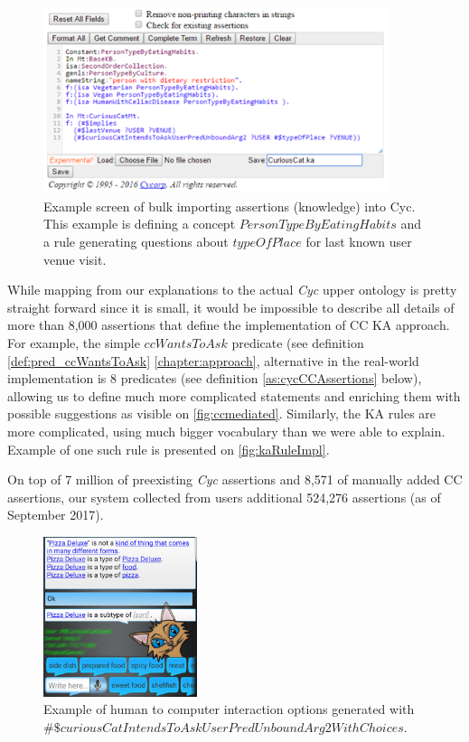 \begin{figure}[H]
	\centering
		\includegraphics[width=0.9\textwidth]{figures/keEntry.png}
	\caption{Example screen of bulk importing assertions (knowledge) into Cyc.
This example is defining a concept $PersonTypeByEatingHabits$ and a rule 
generating questions about $typeOfPlace$ for last known user venue visit.}
	\label{fig:ketext}
\end{figure}

While mapping from our explanations to the actual \emph{Cyc} upper ontology is 
pretty straight forward since it is small, it would be impossible to describe
all details of more than 8,000 assertions that define the implementation of
CC KA approach. For example, the simple $ccWantsToAsk$ predicate (see
definition \ref{def:pred_ccWantsToAsk} \autoref{chapter:approach}, alternative 
in the real-world implementation
is 8 predicates (see definition \ref{as:cycCCAssertions} below), allowing us to
define much more complicated statements and
enriching them with possible suggestions as visible on \autoref{fig:ccmediated}.
Similarly, the KA rules are more complicated, using much bigger vocabulary
than we were able to explain. Example of one such rule is presented on
\autoref{fig:kaRuleImpl}.

On top of 7 million of preexisting \emph{Cyc} assertions and 8,571 of manually
added CC assertions, our system collected from users additional 524,276 
assertions (as of September 2017).

\begin{figure}[h]
	\centering
		\includegraphics[width=0.4\textwidth]{figures/androidMediated.png}
	\caption{Example of human to computer interaction options generated with
$\#\$curiousCatIntendsToAskUserPredUnboundArg2WithChoices$.}
	\label{fig:ccmediated}
\end{figure}

